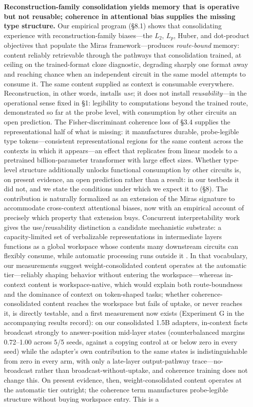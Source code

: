\documentclass[11pt]{article}
\begin{document}
\textbf{Reconstruction-family consolidation yields memory that is operative but not reusable; coherence in attentional bias supplies the missing type structure.} Our empirical program (\S 8.1) shows that consolidating experience with reconstruction-family biases---the $L_2$, $L_p$, Huber, and dot-product objectives that populate the Miras framework---produces \emph{route-bound} memory: content reliably retrievable through the pathways that consolidation trained, at ceiling on the trained-format cloze diagnostic, degrading sharply one format away and reaching chance when an independent circuit in the same model attempts to consume it. The same content supplied as context is consumable everywhere. Reconstruction, in other words, installs \emph{use}; it does not install \emph{reusability}---in the operational sense fixed in \S 1: legibility to computations beyond the trained route, demonstrated so far at the probe level, with consumption by other circuits an open prediction. The Fisher-discriminant coherence loss of \S 3.4 supplies the representational half of what is missing: it manufactures durable, probe-legible type tokens---consistent representational regions for the same content across the contexts in which it appears---an effect that replicates from linear models to a pretrained billion-parameter transformer with large effect sizes. Whether type-level structure additionally unlocks functional consumption by other circuits is, on present evidence, an open prediction rather than a result: in our testbeds it did not, and we state the conditions under which we expect it to (\S 8). The contribution is naturally formalized as an extension of the Miras signature to accommodate cross-context attentional biases, now with an empirical account of precisely which property that extension buys. Concurrent interpretability work gives the use/reusability distinction a candidate mechanistic substrate: a capacity-limited set of verbalizable representations in intermediate layers functions as a global workspace whose contents many downstream circuits can flexibly consume, while automatic processing runs outside it \cite{workspace2026}. In that vocabulary, our measurements suggest weight-consolidated content operates at the automatic tier---reliably shaping behavior without entering the workspace---whereas in-context content is workspace-native, which would explain both route-boundness and the dominance of context on token-shaped tasks; whether coherence-consolidated content reaches the workspace but fails of uptake, or never reaches it, is directly testable, and a first measurement now exists (Experiment G in the accompanying results record): on our consolidated 1.5B adapters, in-context facts broadcast strongly to answer-position mid-layer states (counterbalanced margins 0.72--1.00 across 5/5 seeds, against a copying control at or below zero in every seed) while the adapter's own contribution to the same states is indistinguishable from zero in every arm, with only a late-layer output-pathway trace---no-broadcast rather than broadcast-without-uptake, and coherence training does not change this. On present evidence, then, weight-consolidated content operates at the automatic tier outright; the coherence term manufactures probe-legible structure without buying workspace entry. This is a 
\end{document}
